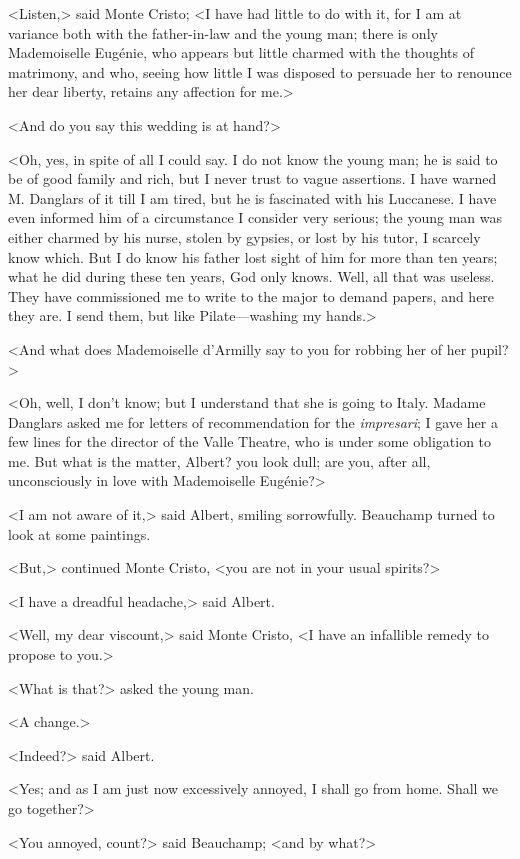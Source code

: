  <Listen,> said Monte Cristo; <I have had little to do with it, for I am at variance both with the father-in-law and the young man; there is only Mademoiselle Eugénie, who appears but little charmed with the thoughts of matrimony, and who, seeing how little I was disposed to persuade her to renounce her dear liberty, retains any affection for me.> 

 <And do you say this wedding is at hand?> 

 <Oh, yes, in spite of all I could say. I do not know the young man; he is said to be of good family and rich, but I never trust to vague assertions. I have warned M. Danglars of it till I am tired, but he is fascinated with his Luccanese. I have even informed him of a circumstance I consider very serious; the young man was either charmed by his nurse, stolen by gypsies, or lost by his tutor, I scarcely know which. But I do know his father lost sight of him for more than ten years; what he did during these ten years, God only knows. Well, all that was useless. They have commissioned me to write to the major to demand papers, and here they are. I send them, but like Pilate—washing my hands.> 

 <And what does Mademoiselle d'Armilly say to you for robbing her of her pupil?> 

 <Oh, well, I don't know; but I understand that she is going to Italy. Madame Danglars asked me for letters of recommendation for the \textit{impresari}; I gave her a few lines for the director of the Valle Theatre, who is under some obligation to me. But what is the matter, Albert? you look dull; are you, after all, unconsciously in love with Mademoiselle Eugénie?> 

 <I am not aware of it,> said Albert, smiling sorrowfully. Beauchamp turned to look at some paintings. 

 <But,> continued Monte Cristo, <you are not in your usual spirits?> 

 <I have a dreadful headache,> said Albert. 

 <Well, my dear viscount,> said Monte Cristo, <I have an infallible remedy to propose to you.> 

 <What is that?> asked the young man. 

 <A change.> 

 <Indeed?> said Albert. 

 <Yes; and as I am just now excessively annoyed, I shall go from home. Shall we go together?> 

 <You annoyed, count?> said Beauchamp; <and by what?> 


